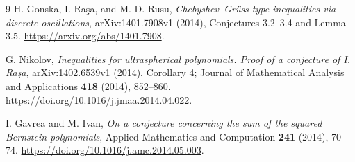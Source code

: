 \documentclass[11pt]{article}
\begin{document}
\begin{thebibliography}{9}
H. Gonska, I. Ra\c{s}a, and M.-D. Rusu,
\emph{Chebyshev--Gr\"uss-type inequalities via discrete oscillations},
arXiv:1401.7908v1 (2014), Conjectures 3.2--3.4 and Lemma 3.5.
\url{https://arxiv.org/abs/1401.7908}.

G. Nikolov,
\emph{Inequalities for ultraspherical polynomials. Proof of a conjecture
of I. Ra\c{s}a}, arXiv:1402.6539v1 (2014), Corollary 4;
Journal of Mathematical Analysis and Applications \textbf{418} (2014),
852--860. \url{https://doi.org/10.1016/j.jmaa.2014.04.022}.

I. Gavrea and M. Ivan,
\emph{On a conjecture concerning the sum of the squared Bernstein
polynomials}, Applied Mathematics and Computation \textbf{241} (2014),
70--74. \url{https://doi.org/10.1016/j.amc.2014.05.003}.
\end{thebibliography}
\end{document}
